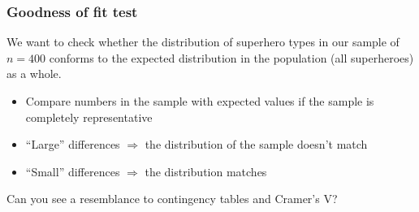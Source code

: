 \documentclass{beamer}
\begin{document}
\begin{frame}
  \frametitle{Goodness of fit test}
  We want to check whether the distribution of superhero types in our sample of $n = 400$ conforms to the expected distribution in the population (all superheroes) as a whole.
  
  \begin{itemize}
    \item Compare numbers in the sample with expected values if the sample is completely representative
    \item ``Large'' differences $\Rightarrow$ the distribution of the sample doesn't match
    \item ``Small'' differences $\Rightarrow$ the distribution matches
  \end{itemize}

  \pause
  Can you see a resemblance to contingency tables and Cramer's V?
\end{frame}
\end{document}
